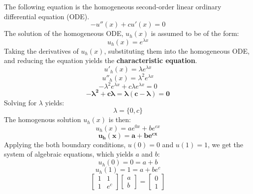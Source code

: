 \documentclass[10pt, reqno]{article}		%
\numberwithin{equation}{section}
\begin{document}
The following equation is the homogeneous second-order linear ordinary differential equation (ODE).
\begin{equation}
- u''(x)+cu'(x)=0
\end{equation}
The solution of the homogeneous ODE, $u_h(x)$ is assumed to be of the form: 
\begin{equation}
u_h(x) = e^{\lambda x}
\end{equation}
Taking the derivatives of $u_h(x)$, substituting them into the homogeneous ODE, and reducing the equation yields the \textbf{characteristic equation}.
\begin{equation}
u'_h(x) = \lambda e^{\lambda x}
\end{equation}
\begin{equation}
u''_h(x) = \lambda^2 e^{\lambda x}
\end{equation}
\begin{equation}
-\lambda^2 e^{\lambda x} + c \lambda e^{\lambda x} = 0
\end{equation}
\begin{equation}
\mathbf{-\lambda^2 + c \lambda = \lambda(c-\lambda) = 0}
\end{equation}
Solving for $\lambda$ yields:
\begin{equation}
\lambda = \{0, c\}
\end{equation}
The homogenous solution $u_h(x)$ is then:
\begin{equation}
u_h(x) = ae^{0x} + be^{cx} 
\end{equation}
\begin{equation}
\mathbf{u_h(x) = a + be^{cx}}
\end{equation}
Applying the both boundary conditions, $u(0) = 0$ and $u(1) = 1$, we get the system of algebraic equations, which yields $a$ and $b$:
\begin{equation}
u_h(0) = 0 = a + b
\end{equation}
\begin{equation}
u_h(1) = 1 = a + be^c
\end{equation}
\begin{equation}
	\begin{bmatrix}
		1 & 1 \\ 1 & e^c
	\end{bmatrix}
	\begin{bmatrix}
	a \\ b
	\end{bmatrix}
	=
	\begin{bmatrix}
	0 \\ 1
	\end{bmatrix}
\end{equation}
\end{document}
